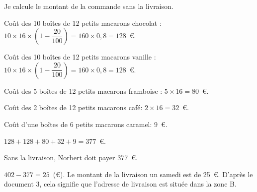 
\medskip

Je calcule le montant de la commande sans la livraison.

Coût des 10 boîtes de 12 petits macarons chocolat : $10\times 16\times \left(1 - \dfrac{20}{100}\right) = 160 \times 0,8 = 128$~\euro.

Coût des 10 boîtes de 12 petits macarons vanille : $10 \times 16 \times \left(1 - \dfrac{20}{100}\right) = 160 \times 0,8 = 128$~\euro.

Coût des 5 boîtes de 12 petits macarons framboise : $5 \times 16 = 80$~\euro.

Coût des 2 boîtes de 12 petits macarons café: $2 \times 16 = 32$~\euro.

Coût d'une boîtes de 6 petits macarons caramel: $9$~\euro.

$128 + 128 + 80 + 32 + 9 =377$~\euro.

Sans la livraison, Norbert doit payer 377~\euro.

$402 - 377 = 25$~(\euro). Le montant de la livraison un samedi est de 25~\euro. D'après le
document 3, cela signifie que l'adresse de livraison est située dans la zone B.
